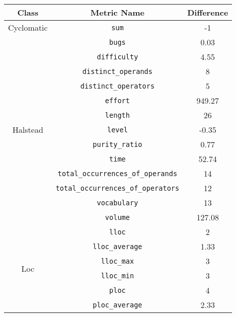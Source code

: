 \begin{center}
  \begin{tabular}{ |c|c|c| }
    \hline

    Class & Metric Name                           & Difference \\

    \hline

    \multirow{ 1 }{6em}{ Cyclomatic }
          & \verb|sum|                            & -1         \\
    \hline
    \multirow{ 13 }{6em}{ Halstead }
          & \verb|bugs|                           & 0.03       \\
          & \verb|difficulty|                     & 4.55       \\
          & \verb|distinct_operands|              & 8          \\
          & \verb|distinct_operators|             & 5          \\
          & \verb|effort|                         & 949.27     \\
          & \verb|length|                         & 26         \\
          & \verb|level|                          & -0.35      \\
          & \verb|purity_ratio|                   & 0.77       \\
          & \verb|time|                           & 52.74      \\
          & \verb|total_occurrences_of_operands|  & 14         \\
          & \verb|total_occurrences_of_operators| & 12         \\
          & \verb|vocabulary|                     & 13         \\
          & \verb|volume|                         & 127.08     \\
    \hline
    \multirow{ 12 }{6em}{ Loc }
          & \verb|lloc|                           & 2          \\
          & \verb|lloc_average|                   & 1.33       \\
          & \verb|lloc_max|                       & 3          \\
          & \verb|lloc_min|                       & 3          \\
          & \verb|ploc|                           & 4          \\
          & \verb|ploc_average|                   & 2.33       \\

\end{tabular}
\end{center}
